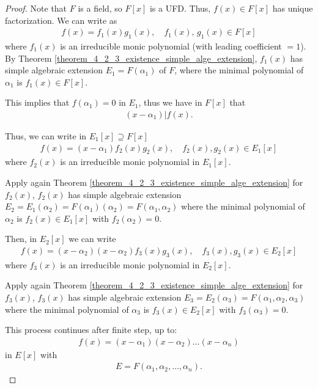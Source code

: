 \documentclass[utf8]{ctexbook}
\theoremstyle{definition}
\begin{document}
\begin{proof}
Note that $F$ is a field, so $F[x]$ is a UFD. Thus, $f(x) \in F[x]$ has unique factorization. We can write as
\begin{align*}
f(x) = f_1 (x) g_1 (x), \quad f_1 (x), \, g_1 (x) \in F[x]
\end{align*}
where $f_1 (x) $ is an irreducible monic polynomial (with leading coefficient $=1$). By Theorem \ref{theorem_4_2_3_existence_simple_alge_extension}, $f_1(x)$ has simple algebraic extension $E_1 = F(\alpha_1)$ of $F$, where the minimal polynomial of $\alpha_1$ is $f_1(x) \in F[x]$.  

This implies that $f(\alpha_1 ) =0 $ in $E_1$, thus we have in $F[x]$ that
\begin{align*}
(x-\alpha_1) | f(x) .
\end{align*}

Thus, we can write in $E_1[x] \supseteq F[x]$ 
\begin{align*}
f(x) = (x- \alpha_1) f_2 (x) g_2 (x), \quad f_2 (x) , g_2 (x) \in E_1 [x]
\end{align*}
where $f_2(x)$ is an irreducible monic polynomial in $E_1 [x]$.

Apply again Theorem \ref{theorem_4_2_3_existence_simple_alge_extension} for $f_2 (x)$, $f_2(x)$ has simple algebraic extension $E_2 = E_1 (\alpha_2) = F(\alpha_1) (\alpha_2) = F(\alpha_1, \alpha_2)$ where the minimal polynomial of $\alpha_2$ is $f_2 (x) \in E_1 [x]$ with $f_2 (\alpha_2) = 0$.

Then, in $E_2 [x]$ we can write
\begin{align*}
f(x) = (x-\alpha_2) (x - \alpha_2) f_3 (x) g_3(x),\quad  f_3(x), g_3(x) \in E_2 [x]
\end{align*}
where $f_3(x)$ is an irreducible monic polynomial in $E_2 [x]$.

Apply again Theorem \ref{theorem_4_2_3_existence_simple_alge_extension} for $f_3(x) $, $f_3(x)$ has simple algebraic extension $E_3 = E_2 (\alpha_3) = F(\alpha_1, \alpha_2, \alpha_3)$ where the minimal polynomial of $\alpha_3$ is $f_3(x) \in E_2 [x]$ with $f_3 (\alpha_3)=0$.

This process continues after finite step, up to:
\begin{align*}
f(x) = (x- \alpha_1 ) (x - \alpha_2 ) \ldots (x - \alpha_n)
\end{align*}
in $E[x]$ with
\begin{align*}
E = F(\alpha_1, \alpha_2 , \ldots, \alpha_n).
\end{align*}


\end{proof}
\end{document}
